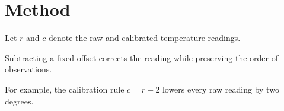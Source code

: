 \section{Method}
Let $r$ and $c$ denote the raw and calibrated temperature readings.

Subtracting a fixed offset corrects the reading while preserving the order of observations.

For example, the calibration rule $c=r-2$ lowers every raw reading by two degrees.
